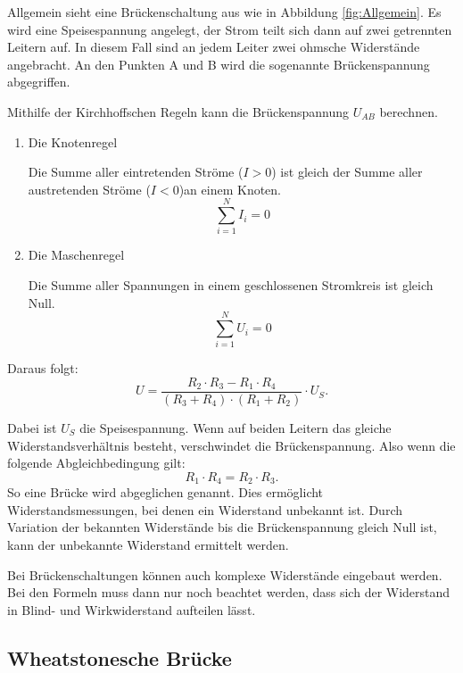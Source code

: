 Allgemein sieht eine Brückenschaltung aus wie in Abbildung \ref{fig:Allgemein}.
Es wird eine Speisespannung angelegt, der Strom teilt sich dann auf zwei getrennten Leitern auf.
In diesem Fall sind an jedem Leiter zwei ohmsche Widerstände angebracht.
An den Punkten A und B wird die sogenannte Brückenspannung abgegriffen.

Mithilfe der Kirchhoffschen Regeln kann die Brückenspannung $U_{AB}$ berechnen.
\begin{enumerate}
    \item {Die Knotenregel
    
    Die Summe aller eintretenden Ströme ($I>0$) ist gleich der Summe aller austretenden Ströme ($I<0$)an einem Knoten.
    \begin{equation}
        {\sum_{i=1}^N I_i} = 0
    \end{equation}
    }

    \item{Die Maschenregel
    
    Die Summe aller Spannungen in einem geschlossenen Stromkreis ist gleich Null.
    \begin{equation}
        {\sum_{i=1}^N U_i} = 0
    \end{equation}}
\end{enumerate}

Daraus folgt:
\begin{equation}
    U = \frac{R_2 \cdot R_3 - R_1 \cdot R_4}{(R_3 + R_4) \cdot (R_1 + R_2)} \cdot U_S .
\end{equation}

Dabei ist $U_S$ die Speisespannung.
Wenn auf beiden Leitern das gleiche Widerstandsverhältnis besteht, verschwindet die Brückenspannung.
Also wenn die folgende Abgleichbedingung gilt:
\begin{equation}
\label{eq:Abgleichbedingung}
    R_1 \cdot R_4 = R_2 \cdot R_3 .
\end{equation}
So eine Brücke wird abgeglichen genannt.
Dies ermöglicht Widerstandsmessungen, bei denen ein Widerstand unbekannt ist.
Durch Variation der bekannten Widerstände bis die Brückenspannung gleich Null ist, kann der unbekannte Widerstand ermittelt werden.

Bei Brückenschaltungen können auch komplexe Widerstände eingebaut werden.
Bei den Formeln muss dann nur noch beachtet werden, dass sich der Widerstand in Blind- und Wirkwiderstand aufteilen lässt.

\subsection{Wheatstonesche Brücke}

